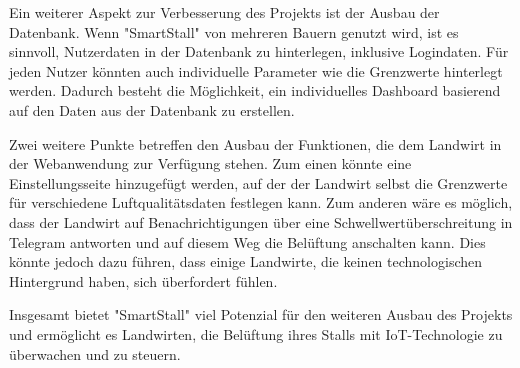 \documentclass[conference]{IEEEtran}
\begin{document}
Ein weiterer Aspekt zur Verbesserung des Projekts ist der Ausbau der Datenbank. Wenn "SmartStall" von mehreren Bauern genutzt wird, ist es sinnvoll, Nutzerdaten in der Datenbank zu hinterlegen, inklusive Logindaten. Für jeden Nutzer könnten auch individuelle Parameter wie die Grenzwerte hinterlegt werden. Dadurch besteht die Möglichkeit, ein individuelles Dashboard basierend auf den Daten aus der Datenbank zu erstellen.

Zwei weitere Punkte betreffen den Ausbau der Funktionen, die dem Landwirt in der Webanwendung zur Verfügung stehen. Zum einen könnte eine Einstellungsseite hinzugefügt werden, auf der der Landwirt selbst die Grenzwerte für verschiedene Luftqualitätsdaten festlegen kann. Zum anderen wäre es möglich, dass der Landwirt auf Benachrichtigungen über eine Schwellwertüberschreitung in Telegram antworten und auf diesem Weg die Belüftung anschalten kann. Dies könnte jedoch dazu führen, dass einige Landwirte, die keinen technologischen Hintergrund haben, sich überfordert fühlen.

Insgesamt bietet "SmartStall" viel Potenzial für den weiteren Ausbau des Projekts und ermöglicht es Landwirten, die Belüftung ihres Stalls mit IoT-Technologie zu überwachen und zu steuern.
\end{document}
